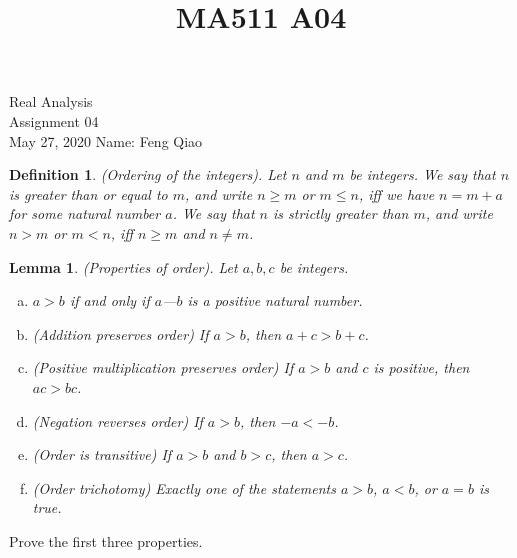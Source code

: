 \documentclass[12pt]{article}
\title{MA511 A04}
\newtheorem{lem}{Lemma}%
\newtheorem{defn}{Definition}
\begin{document}
\begin{flushleft}
{\sc \Large Real Analysis} \\
\medskip
Assignment 04\\
May 27, 2020
\hfill Name: Feng Qiao\\

\setdefaultleftmargin{0pt}{}{}{}{}{}

\begin{defn}
(Ordering of the integers). Let \(n\) and \(m\) be integers. We say that \(n\) is greater than or equal to \(m\), and write \(n \geq m\) or \(m \leq n\),  iff we have \(n = m + a\) for some natural number \(a\). We say that \(n\) is strictly greater than \(m\), and write \(n > m\) or \(m < n\), iff \(n \geq m\) and \(n \neq m\).
\end{defn}

\begin{lem}
(Properties of order). Let \(a, b, c\) be integers.
\begin{enumerate}[(a)]
    \item \(a > b\) if and only if \(a\)---\(b\) is a positive natural number.
    \item (Addition preserves order) If \(a > b\), then \(a + c > b + c\).
    \item (Positive multiplication preserves order) If \(a > b\) and \(c\) is positive, then \(ac > bc\).
    \item (Negation reverses order) If \(a > b\), then \(-a < -b\).
    \item (Order is transitive) If \(a > b\) and \(b > c\), then \(a > c\).
    \item (Order trichotomy) Exactly one of the statements \(a > b\), \(a < b\), or \(a = b\) is true.
\end{enumerate}
\end{lem}

Prove the first three properties.

\end{flushleft}
\end{document}
